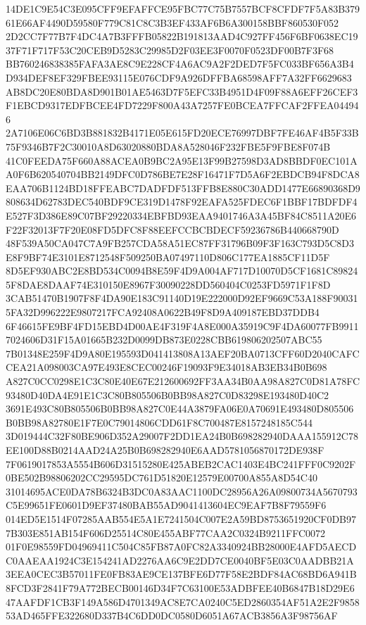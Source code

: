 \documentclass[UTF8,fontset=fandol,zihao=-4,a4paper]{ctexart}
\begin{document}
{{14DE1C9E54C3E095CFF9EFAFFCE95FBC77C75B7557BCF8CFDF7F5A83B37961E66AF4490D59580F779C81C8C3B3EF433AF6B6A300158BBF860530F052
2D2CC7F77B7F4DC4A7B3FFFB05822B191813AAD4C927FF456F6BF0638EC1937F71F717F53C20CEB9D5283C29985D2F03EE3F0070F0523DF00B7F3F68
BB760246838385FAFA3AE8C9E228CF4A6AC9A2F2DED7F5FC033BF656A3B4D934DEF8EF329FBEE93115E076CDF9A926DFFBA68598AFF7A32FF6629683
AB8DC20E80BDA8D901B01AE5463D7F5EFC33B4951D4F09F88A6EFF26CEF3F1EBCD9317EDFBCEE4FD7229F800A43A7257FE0BCEA7FFCAF2FFEA044946
2A7106E06C6BD3B881832B4171E05E615FD20ECE76997DBF7FE46AF4B5F33B75F9346B7F2C30010A8D63020880BDA8A528046F232FBE5F9FBE8F074B
41C0FEEDA75F660A88ACEA0B9BC2A95E13F99B27598D3AD8BBDF0EC101AA0F6B620540704BB2149DFC0D786BE7E28F16471F7D5A6F2EBDCB94F8DCA8
EAA706B1124BD18FFEABC7DADFDF513FFB8E880C30ADD1477E66890368D9808634D62783DEC540BDF9CE319D1478F92EAFA525FDEC6F1BBF17BDFDF4
E527F3D386E89C07BF29220334EBFBD93EAA9401746A3A45BF84C8511A20E6F22F32013F7F20E08FD5DFC8F88EEFCCBCBDECF59236786B440668790D
48F539A50CA047C7A9FB257CDA58A51EC87FF31796B09F3F163C793D5C8D3E8F9BF74E3101E8712548F509250BA07497110D806C177EA1885CF11D5F
8D5EF930ABC2E8BD534C0094B8E59F4D9A004AF717D10070D5CF1681C898245F8DAE8DAAF74E310150E8967F30090228DD560404C0253FD5971F1F8D
3CAB51470B1907F8F4DA90E183C91140D19E222000D92EF9669C53A188F900315FA32D996222E9807217FCA92408A0622B49F8D9A409187EBD37DDB4
6F46615FE9BF4FD15EBD4D00AE4F319F4A8E000A35919C9F4DA60077FB99117024606D31F15A01665B232D0099DB873E0228CBB619806202507ABC55
7B01348E259F4D9A80E195593D041413808A13AEF20BA0713CFF60D2040CAFCCEA21A098003CA97E493E8CEC00246F19093F9E34018AB3EB34B0B698
A827C0CC0298E1C3C80E40E67E212600692FF3AA34B0AA98A827C0D81A78FC93480D40DA4E91E1C3C80B805506B0BB98A827C0D83298E193480D40C2
3691E493C80B805506B0BB98A827C0E44A3879FA06E0A70691E493480D805506B0BB98A82780E1F7E0C79014806CDD61F8C700487E8157248185C544
3D019444C32F80BE906D352A29007F2DD1EA24B0B698282940DAAA155912C78EE100D88B0214AAD24A25B0B698282940E6AAD5781056870172DE938F
7F0619017853A5554B606D31515280E425ABEB2CAC1403E4BC241FFF0C9202F0BE502B98806202CC29595DC761D51820E12579E00700A855A8D54C40
31014695ACE0DA78B6324B3DC0A83AAC1100DC28956A26A09800734A5670793C5E99651FE0601D9EF37480BAB55AD9041413604EC9EAF7B8F79559F6
014ED5E1514F07285AAB554E5A1E7241504C007E2A59BD8753651920CF0DB977B303E851AB154F606D25514C80E455ABF77CAA2C0324B9211FFC0072
01F0E98559FD04969411C504C85FB87A0FC82A3340924BB28000E4AFD5AECDC0AAEAA1924C3E154241AD2276AA6C9E2DD7CE0040BF5E03C0AADBB21A
3EEA0CEC3B57011FE0FB83AE9CE137BFE6D77F58E2BDF84AC68BD6A941B8FCD3F2841F79A772BECB00146D34F7C63100E53ADBFEE40B6847B18D29E6
47AAFDF1CB3F149A586D4701349AC8E7CA0240C5ED2860354AF51A2E2F985853AD465FFE322680D337B4C6DD0DC0580D6051A67ACB3856A3F98756AF
}}
\end{document}
